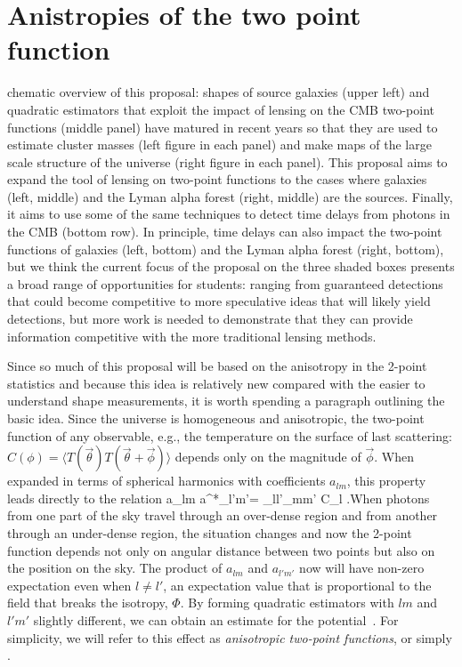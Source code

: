 \section{Anistropies of the two point function}

chematic overview of this proposal: shapes of source
  galaxies (upper left) and quadratic estimators that exploit the
  impact of lensing on the CMB two-point functions (middle panel) have
  matured in recent years so that they are used to estimate cluster
  masses (left figure in each panel) and make maps of the large scale
  structure of the universe (right figure in each panel). This
  proposal aims to expand the tool of lensing on two-point functions
  to the cases where galaxies (left, middle) and the Lyman alpha
  forest (right, middle) are the sources. Finally, it aims to use some
  of the same techniques to detect time delays from photons in the CMB
  (bottom row). In principle, time delays can also impact the
  two-point functions of galaxies (left, bottom) and the Lyman alpha
  forest (right, bottom), but we think the current focus of the
  proposal on the three shaded boxes presents a broad range of
  opportunities for students: ranging from guaranteed detections that
  could become competitive to more speculative ideas that will likely
  yield detections, but more work is needed to demonstrate that they
  can provide information competitive with the more traditional
  lensing methods.

 Since so much of this proposal will be based on
the anisotropy in the 2-point statistics and because this idea is
relatively new \citep{Hu:2001tn} compared with the easier to
understand shape measurements, it is worth spending a paragraph
outlining the basic idea. Since the universe is homogeneous and
anisotropic, the two-point function of any observable, e.g., the
temperature on the surface of last scattering: $C(\phi)=\langle T(\vec
\theta)T(\vec\theta+\vec{\phi})\rangle$ depends only on the magnitude
of $\vec\phi$. When expanded in terms of spherical harmonics with
coefficients $a_{lm}$, this property leads directly to the relation
\be \langle a_{lm} a^*_{l'm'}\rangle = \delta_{ll'}\delta_{mm'} C_l
.\ee When photons from one part of the sky travel through an
over-dense region and from another through an under-dense region, the
situation changes and now the 2-point function depends not only on
angular distance between two points but also on the position on the
sky. The product of $a_{lm}$ and $a_{l'm'}$ now will have non-zero
expectation even when $l\ne l'$, an expectation value that is
proportional to the field that breaks the isotropy, $\Phi$. By forming
quadratic estimators with $lm$ and $l'm'$ slightly different, we can
obtain an estimate for the potential~\citep{Hu:2001tn,okamoto}. For
simplicity, we will refer to this effect as {\it anisotropic two-point
  functions}, or simply \atf.
 
